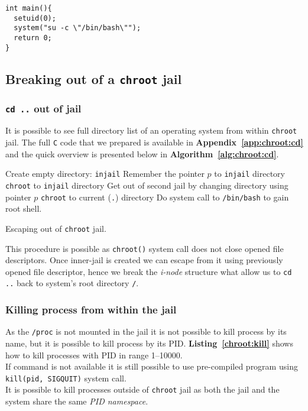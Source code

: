 \documentclass[12pt, a4paper, pdflatex]{article}
\begin{document}
\vspace{1em}
\begin{lstlisting}
int main(){
  setuid(0);
  system("su -c \"/bin/bash\"");
  return 0;
}
\end{lstlisting}

\subsection{Breaking out of a \texttt{chroot} jail}
\subsubsection{\texttt{cd ..} out of jail}
It is possible to see full directory list of an operating system from within \texttt{chroot} jail. The full \texttt{C} code that we prepared is available in \textbf{Appendix~\ref{app:chroot:cd}} and the quick overview is presented below in \textbf{Algorithm~\ref{alg:chroot:cd}}.


\SetAlCapSkip{1em}
\LinesNumbered
{}
\vspace{1em}
\begin{algorithm}[h]
  Create empty directory: \texttt{injail}\;
  Remember the pointer $p$ to \texttt{injail} directory\;
  \texttt{chroot} to \texttt{injail} directory\;
  Get out of second jail by changing directory using pointer $p$\;
  \texttt{chroot} to current (\texttt{.}) directory\;
  Do system call to \texttt{/bin/bash} to gain root shell.
  \caption{Escaping out of \texttt{chroot} jail.\label{alg:chroot:cd}}
\end{algorithm}
\vspace{1em}

This procedure is possible as \texttt{chroot()} system call does not close opened file descriptors. Once inner-jail is created we can escape from it using previously opened file descriptor, hence we break the \emph{i-node} structure what allow us to \texttt{cd ..} back to system's root directory \texttt{/}.

\subsubsection{Killing process from within the jail}
As the \texttt{/proc} is not mounted in the jail it is not possible to kill process by its name, but it is possible to kill process by its PID. \textbf{Listing~\ref{chroot:kill}} shows how to kill processes with PID in range 1--10000.\\
If command is not available it is still possible to use pre-compiled program using \texttt{kill(pid, SIGQUIT)} system call.\\
It is possible to kill processes outside of \texttt{chroot} jail as both the jail and the system share the same \emph{PID namespace}.
\end{document}
